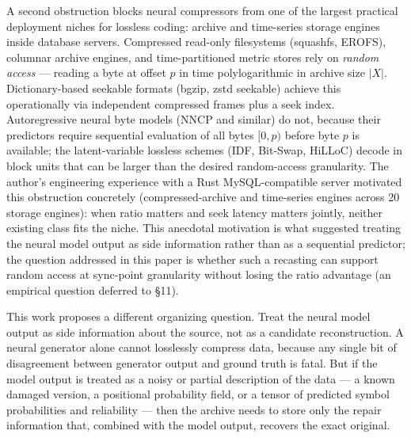 \documentclass[
]{article}
\begin{document}
A second obstruction blocks neural compressors from one of the largest
practical deployment niches for lossless coding: archive and
time-series storage engines inside database servers. Compressed
read-only filesystems (squashfs, EROFS), columnar archive engines, and
time-partitioned metric stores rely on \emph{random access} ---
reading a byte at offset $p$ in time polylogarithmic in archive
size $|X|$. Dictionary-based seekable formats (bgzip, zstd seekable)
achieve this operationally via independent compressed frames plus a
seek index. Autoregressive neural byte models (NNCP and similar) do
not, because their predictors require sequential evaluation of all
bytes $[0, p)$ before byte $p$ is available; the latent-variable lossless schemes
(IDF, Bit-Swap, HiLLoC) decode in block units that can be larger than
the desired random-access granularity. The author's engineering
experience with a Rust MySQL-compatible server motivated this
obstruction concretely (compressed-archive and time-series engines
across 20 storage engines): when ratio matters and seek latency
matters jointly, neither existing class fits the niche. This anecdotal
motivation is what suggested treating the neural model output as side
information rather than as a sequential predictor; the question
addressed in this paper is whether such a recasting can support random
access at sync-point granularity without losing the ratio advantage
(an empirical question deferred to §11).

This work proposes a different organizing question. Treat the neural
model output as side information about the source, not as a candidate
reconstruction. A neural generator alone cannot losslessly compress
data, because any single bit of disagreement between generator output
and ground truth is fatal. But if the model output is treated as a noisy
or partial description of the data --- a known damaged version, a
positional probability field, or a tensor of predicted symbol
probabilities and reliability --- then the archive needs to store only
the repair information that, combined with the model output, recovers
the exact original.
\end{document}
